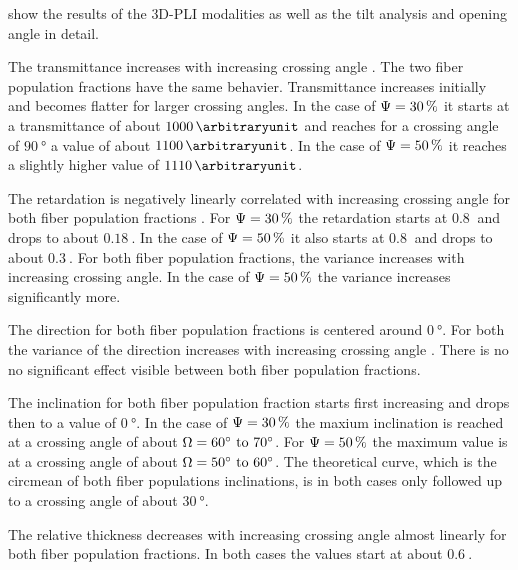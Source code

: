 %
 show the results of the \ac{3D-PLI} modalities as well as the tilt analysis and opening angle in detail.
\par
The transmittance increases with increasing crossing angle \modelOmega{}.
The two fiber population fractions \modelPsi{} have the same behavier.
Transmittance increases initially and becomes flatter for larger crossing angles.
In the case of $\textnormal{$\Psi$} = \SI{30}{\percent}$ it starts at a transmittance of about $\SI{1000}{\arbitraryunit}$ and reaches for a crossing angle of $\SI{90}{\degree}$ a value of about $\SI{1100}{\arbitraryunit}$.
In the case of $\textnormal{$\Psi$} = \SI{50}{\percent}$ it reaches a slightly higher value of $\SI{1110}{\arbitraryunit}$.
\par
The retardation is negatively linearly correlated with increasing crossing angle for both fiber population fractions \modelPsi{}.
For $\textnormal{$\Psi$}=\SI{30}{\percent}$ the retardation starts at $\SI{0.8}{}$ and drops to about $\SI{0.18}{}$.
In the case of $\textnormal{$\Psi$}=\SI{50}{\percent}$ it also starts at $\SI{0.8}{}$ and drops to about $\SI{0.3}{}$.
For both fiber population fractions, the variance increases with increasing crossing angle.
In the case of $\textnormal{$\Psi$}=\SI{50}{\percent}$ the variance increases significantly more.
\par
The direction for both fiber population fractions \modelPsi{} is centered around $\SI{0}{\degree}$.
For both \modelPsi{} the variance of the direction increases with increasing crossing angle \modelOmega{}.
There is no no significant effect visible between both fiber population fractions.
\par
The inclination for both fiber population fraction starts first increasing and drops then to a value of $\SI{0}{\degree}$.
In the case of $\textnormal{$\Psi$}=\SI{30}{\percent}$ the maxium inclination is reached at  a crossing angle of about $\modelOmega=\SIrange{60}{70}{\degree}$.
For $\textnormal{$\Psi$}=\SI{50}{\percent}$ the maximum value is at a crossing angle of about $\modelOmega=\SIrange{50}{60}{\degree}$.
The theoretical curve, which is the circmean of both fiber populations inclinations, is in both cases only followed up to a crossing angle of about $\SI{30}{\degree}$.
\par
The relative thickness \trel{} decreases with increasing crossing angle \modelOmega{} almost linearly for both fiber population fractions.
In both cases the \trel{} values start at about $\SI{0.6}{}$.
